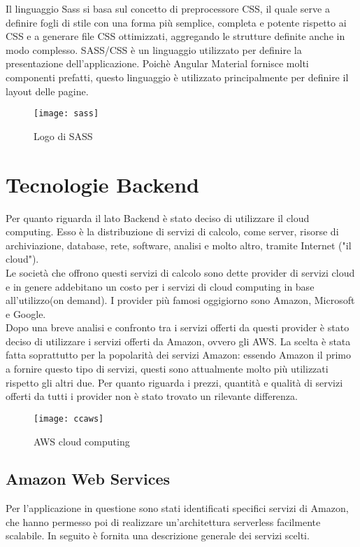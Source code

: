 Il linguaggio Sass si basa sul concetto di preprocessore CSS, il quale serve a definire fogli di stile con una forma più semplice, completa e potente rispetto ai CSS e a generare file CSS ottimizzati, aggregando le strutture definite anche in modo complesso. SASS/CSS è un linguaggio utilizzato per definire la presentazione dell'applicazione. Poichè Angular Material fornisce molti componenti prefatti, questo linguaggio è utilizzato principalmente per definire il layout delle pagine. 
\begin{figure}[!h] 
	\centering 
	\texttt{[image: sass]}
	\caption{Logo di SASS}
\end{figure}

\section{Tecnologie Backend}
Per quanto riguarda il lato Backend è stato deciso di utilizzare il cloud computing. Esso è la distribuzione di servizi di calcolo, come server, risorse di archiviazione, database, rete, software, analisi e molto altro, tramite Internet ("il cloud"). 
\\

Le società che offrono questi servizi di calcolo sono dette provider di servizi cloud e in genere addebitano un costo per i servizi di cloud computing in base all'utilizzo(on demand). I provider più famosi oggigiorno sono Amazon, Microsoft e Google. 
\\

Dopo una breve analisi e confronto tra i servizi offerti da questi provider è stato deciso di utilizzare i servizi offerti da Amazon, ovvero gli AWS. La scelta è stata fatta soprattutto per la popolarità dei servizi Amazon: essendo Amazon il primo a fornire questo tipo di servizi, questi sono attualmente molto più utilizzati rispetto gli altri due. Per quanto riguarda i prezzi, quantità e qualità di servizi offerti da tutti i provider non è stato trovato un rilevante differenza. 
\begin{figure}[!h] 
	\centering 
	\texttt{[image: ccaws]}
	\caption{AWS cloud computing}
\end{figure} 
\subsection{Amazon Web Services}
Per l'applicazione in questione sono stati identificati specifici servizi di Amazon, che hanno permesso poi di realizzare un'architettura serverless facilmente scalabile. In seguito è fornita una descrizione generale dei servizi scelti.


